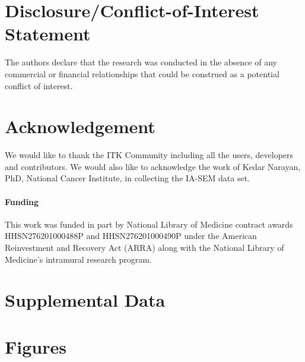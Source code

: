 \documentclass{frontiersMED} %
\begin{document}
\section*{Disclosure/Conflict-of-Interest Statement}
The authors declare that the research was conducted in the absence of any commercial or financial relationships that could be construed as a potential conflict of interest.

\section*{Acknowledgement}

We would like to thank the ITK Community including all the users,
developers and contributors. We would also like to acknowledge the
work of Kedar Narayan, PhD, National Cancer Institute,  in collecting
the IA-SEM data set.

\paragraph{Funding\textcolon}

This work was funded in part by National Library of Medicine contract
awards HHSN276201000488P and HHSN276201000490P under the American
Reinvestment and Recovery Act (ARRA) along with the National Library
of Medicine's intramural research program.

\section*{Supplemental Data}




\section*{Figures}

\end{document}
